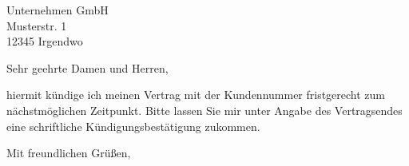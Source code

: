 \documentclass[
    absender,
    visualize,
    paper=a4,
    version=last,
    fontsize=11pt,
    DIV=13,
    BCOR=0mm]{scrlttr2}
\begin{document}
\makeatletter{}\makeatother





\begin{letter}{
    Unternehmen GmbH\\
    Musterstr. 1\\
    12345 Irgendwo
}
\opening{Sehr geehrte Damen und Herren,}

hiermit kündige ich meinen Vertrag mit der Kundennummer \customer{} fristgerecht zum nächstmöglichen Zeitpunkt.
Bitte lassen Sie mir unter Angabe des Vertragsendes eine schriftliche Kündigungsbestätigung zukommen.

\closing{Mit freundlichen Grüßen,}
\end{letter}
\end{document}
